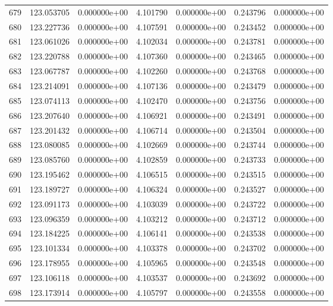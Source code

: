 \begin{tabular}{rrrrrrr}
 679 & 123.053705 &  0.000000e+00 &  4.101790 &  0.000000e+00 &    0.243796 &  0.000000e+00 \\
 680 & 123.227736 &  0.000000e+00 &  4.107591 &  0.000000e+00 &    0.243452 &  0.000000e+00 \\
 681 & 123.061026 &  0.000000e+00 &  4.102034 &  0.000000e+00 &    0.243781 &  0.000000e+00 \\
 682 & 123.220788 &  0.000000e+00 &  4.107360 &  0.000000e+00 &    0.243465 &  0.000000e+00 \\
 683 & 123.067787 &  0.000000e+00 &  4.102260 &  0.000000e+00 &    0.243768 &  0.000000e+00 \\
 684 & 123.214091 &  0.000000e+00 &  4.107136 &  0.000000e+00 &    0.243479 &  0.000000e+00 \\
 685 & 123.074113 &  0.000000e+00 &  4.102470 &  0.000000e+00 &    0.243756 &  0.000000e+00 \\
 686 & 123.207640 &  0.000000e+00 &  4.106921 &  0.000000e+00 &    0.243491 &  0.000000e+00 \\
 687 & 123.201432 &  0.000000e+00 &  4.106714 &  0.000000e+00 &    0.243504 &  0.000000e+00 \\
 688 & 123.080085 &  0.000000e+00 &  4.102669 &  0.000000e+00 &    0.243744 &  0.000000e+00 \\
 689 & 123.085760 &  0.000000e+00 &  4.102859 &  0.000000e+00 &    0.243733 &  0.000000e+00 \\
 690 & 123.195462 &  0.000000e+00 &  4.106515 &  0.000000e+00 &    0.243515 &  0.000000e+00 \\
 691 & 123.189727 &  0.000000e+00 &  4.106324 &  0.000000e+00 &    0.243527 &  0.000000e+00 \\
 692 & 123.091173 &  0.000000e+00 &  4.103039 &  0.000000e+00 &    0.243722 &  0.000000e+00 \\
 693 & 123.096359 &  0.000000e+00 &  4.103212 &  0.000000e+00 &    0.243712 &  0.000000e+00 \\
 694 & 123.184225 &  0.000000e+00 &  4.106141 &  0.000000e+00 &    0.243538 &  0.000000e+00 \\
 695 & 123.101334 &  0.000000e+00 &  4.103378 &  0.000000e+00 &    0.243702 &  0.000000e+00 \\
 696 & 123.178955 &  0.000000e+00 &  4.105965 &  0.000000e+00 &    0.243548 &  0.000000e+00 \\
 697 & 123.106118 &  0.000000e+00 &  4.103537 &  0.000000e+00 &    0.243692 &  0.000000e+00 \\
 698 & 123.173914 &  0.000000e+00 &  4.105797 &  0.000000e+00 &    0.243558 &  0.000000e+00 \\

\end{tabular}

